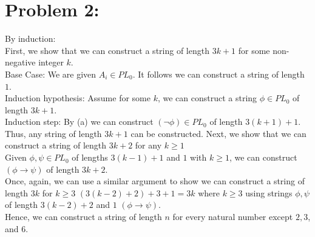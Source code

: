 \documentclass[10pt]{article}
\begin{document}
\section*{Problem 2:}
By induction:\\
First, we show that we can construct a string of length $3k+1$ for some non-negative integer $k$.\\
Base Case: We are given $A_i\in PL_0$. It follows we can construct a string of length $1$.\\
Induction hypothesis: Assume for some $k$, we can construct a string $\phi\in PL_0$ of length $3k+1$.\\
Induction step: By (a) we can construct $(\lnot \phi)\in PL_0$ of length $3(k+1)+1$.\\
Thus, any string of length $3k+1$ can be constructed.
Next, we show that we can construct a string of length $3k+2$ for any $k\ge 1$\\
Given $\phi,\psi\in PL_0$ of lengths $3(k-1)+1$ and $1$ with $k\ge1$, we can construct $(\phi\rightarrow \psi)$ of length $3k+2$.\\
Once, again, we can use a similar argument to show we can construct a string of length $3k$ for $k\ge 3$ $(3(k-2)+2)+3+1=3k$ where $k\ge3$ using strings $\phi,\psi$ of length $3(k-2)+2$ and $1$ $(\phi\rightarrow \psi)$.\\
Hence, we can construct a string of length $n$ for every natural number except $2,3$, and $6$.
\end{document}
